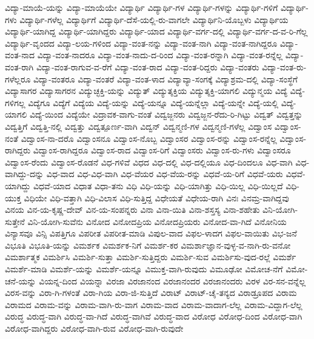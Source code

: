 {ವಿದ್ಯಾ-ಮಾಯೆ-ಯನ್ನು
ವಿದ್ಯಾ-ಮಾಯೆಯೇ
ವಿದ್ಯಾರ್ಥಿ
ವಿದ್ಯಾರ್ಥಿ-ಗಳ
ವಿದ್ಯಾರ್ಥಿ-ಗಳನ್ನು
ವಿದ್ಯಾರ್ಥಿ-ಗಳಿಗೆ
ವಿದ್ಯಾರ್ಥಿ-ಗಳು
ವಿದ್ಯಾರ್ಥಿ-ಗಳೆಲ್ಲ
ವಿದ್ಯಾರ್ಥಿಗೆ
ವಿದ್ಯಾರ್ಥಿ-ದೆಸೆ-ಯಲ್ಲಿ-ರು-ವಾಗಲೇ
ವಿದ್ಯಾರ್ಥಿನಿ-ಯೊಬ್ಬಳು
ವಿದ್ಯಾರ್ಥಿಯ
ವಿದ್ಯಾರ್ಥಿ-ಯಾಗಿದ್ದ
ವಿದ್ಯಾರ್ಥಿ-ಯಾಗಿದ್ದರು
ವಿದ್ಯಾರ್ಥಿ-ಯಾದ
ವಿದ್ಯಾರ್ಥಿ-ವರ್ಗ-ದಲ್ಲಿ
ವಿದ್ಯಾರ್ಥಿ-ವರ್ಗ-ದ-ವ-ರಿ-ಗೆಲ್ಲ
ವಿದ್ಯಾರ್ಥಿ-ವೃಂದದ
ವಿದ್ಯಾ-ಲಯ-ಗಳಿಂದ
ವಿದ್ಯಾ-ವಂತ-ನನ್ನು
ವಿದ್ಯಾ-ವಂತ-ನಾಗಿ
ವಿದ್ಯಾ-ವಂತ-ನಾಗಿದ್ದರೂ
ವಿದ್ಯಾ-ವಂತ-ನಾದ
ವಿದ್ಯಾ-ವಂತ-ನಾದರೂ
ವಿದ್ಯಾ-ವಂತ-ನಾದು-ದ-ರಿಂದ
ವಿದ್ಯಾ-ವಂತ-ರನ್ನಾಗಿ
ವಿದ್ಯಾ-ವಂತ-ರನ್ನೆಲ್ಲ
ವಿದ್ಯಾ-ವಂತ-ರಾಗಿ
ವಿದ್ಯಾ-ವಂತ-ರಾಗುವ-ವ-ರೆಗೆ
ವಿದ್ಯಾ-ವಂತ-ರಾದ
ವಿದ್ಯಾ-ವಂತ-ರಿದ್ದರು
ವಿದ್ಯಾ-ವಂತರು
ವಿದ್ಯಾ-ವಂತ-ರು-ಗಳೆಲ್ಲರೂ
ವಿದ್ಯಾ-ವಂತರೂ
ವಿದ್ಯಾ-ವಂತರೆ
ವಿದ್ಯಾ-ವಂತ-ಳಾದ
ವಿದ್ಯಾವ್ಯಾ-ಸಂಗಕ್ಕೆ
ವಿದ್ಯಾಶ್ರಮ-ದಲ್ಲಿ
ವಿದ್ಯಾ-ಸಂಸ್ಥೆಗೆ
ವಿದ್ಯಾಸಾಗರ
ವಿದ್ಯಾಸಾಗರನ
ವಿದ್ಯುಚ್ಛಕ್ತಿ-ಯನ್ನು
ವಿದ್ಯುತ್
ವಿದ್ಯುತ್ಶಕ್ತಿಯ
ವಿದ್ಯುತ್ಶಕ್ತಿ-ಯಾಗಲಿ
ವಿದ್ಯುನ್ಮಯ
ವಿದ್ಯೆ
ವಿದ್ಯೆ-ಗಳಿಗಲ್ಲ
ವಿದ್ಯೆಗೂ
ವಿದ್ಯೆಗೆ
ವಿದ್ಯೆಯ
ವಿದ್ಯೆ-ಯನ್ನು
ವಿದ್ಯೆ-ಯನ್ನೂ
ವಿದ್ಯೆ-ಯನ್ನೆಲ್ಲಾ
ವಿದ್ಯೆ-ಯನ್ನೇ
ವಿದ್ಯೆ-ಯಲ್ಲಿ
ವಿದ್ಯೆ-ಯಾಗಲಿ
ವಿದ್ಯೆ-ಯಿಂದ
ವಿದ್ಯೆಯೇ
ವಿದ್ರಾವಕ-ವಾಗು-ವಂತೆ
ವಿದ್ವಜ್ಜನರು
ವಿದ್ವಜ್ಜನ-ರೆದು-ರಿ-ಗಿಟ್ಟು
ವಿದ್ವತ್
ವಿದ್ವತ್ತನ್ನು
ವಿದ್ವತ್ತಿಗೆ
ವಿದ್ವತ್ತಿ-ನಲ್ಲಿ
ವಿದ್ವತ್ತು
ವಿದ್ವತ್ಪೂರ್ಣ-ವಾಗಿ
ವಿದ್ವನ್
ವಿದ್ವನ್ಮಣಿ-ಗಳ
ವಿದ್ವನ್ಮಣಿ-ಗಳೆಲ್ಲ
ವಿದ್ವಾಂಸ
ವಿದ್ವಾಂಸ-ನಂತೆ
ವಿದ್ವಾಂಸ-ನಾ-ದರೊ
ವಿದ್ವಾಂಸನೂ
ವಿದ್ವಾಂಸ-ನೊಬ್ಬ
ವಿದ್ವಾಂಸರ
ವಿದ್ವಾಂಸ-ರನ್ನು
ವಿದ್ವಾಂಸ-ರನ್ನೆಲ್ಲ
ವಿದ್ವಾಂಸ-ರಾಗಿದ್ದರು
ವಿದ್ವಾಂಸ-ರಾಗಿದ್ದರೂ
ವಿದ್ವಾಂಸ-ರಾದ
ವಿದ್ವಾಂಸ-ರಿಗೆ
ವಿದ್ವಾಂಸರು
ವಿದ್ವಾಂಸ-ರು-ಗಳು
ವಿದ್ವಾಂಸರೂ
ವಿದ್ವಾಂಸ-ರೆಂದು
ವಿದ್ವಾಂಸ-ರೊಡನೆ
ವಿಧ-ಗಳಿವೆ
ವಿಧದ
ವಿಧ-ದಲ್ಲಿ
ವಿಧ-ದಲ್ಲಿಯೂ
ವಿಧ-ದಿಂದಲೂ
ವಿಧ-ವಾಗಿ
ವಿಧ-ವಾಗಿದ್ದು-ದನ್ನು
ವಿಧ-ವಾದ
ವಿಧ-ವಿಧ-ವಾಗಿ
ವಿಧ-ವೆಯರ
ವಿಧ-ವೆಯ-ರನ್ನು
ವಿಧವೆ-ಯ-ರಿಗೆ
ವಿಧವೆ-ಯರು
ವಿಧವೆ-ಯಾಗಿದ್ದು
ವಿಧವೆ-ಯಾದ
ವಿಧಾತ
ವಿಧಾ-ತನು
ವಿಧಿ
ವಿಧಿ-ಯನ್ನು
ವಿಧಿ-ಯಾಗಿತ್ತು
ವಿಧಿ-ಯಿಲ್ಲ
ವಿಧಿ-ಯಿಲ್ಲದೆ
ವಿಧಿ-ಯುಕ್ತ
ವಿಧಿಯೇ
ವಿಧಿ-ವತ್ತಾಗಿ
ವಿಧಿ-ವಿಲಾಸ
ವಿಧಿ-ಸುತ್ತಿದ್ದ
ವಿಧೇಯತೆ
ವಿಧೇಯ-ರಾಗಿ
ವಿನಃ
ವಿನಮ್ರ-ವಾಗಿದ್ದವು
ವಿನಯ
ವಿನ-ಯ-ಕೃಷ್ಣ-ದೇವ್
ವಿನ-ಯ-ಸಂಪನ್ನರು
ವಿನಾ
ವಿನಾ-ಯಿತಿ
ವಿನಾ-ಶಸ್ತಸ್ಯ
ವಿನಾ-ಶಹೇತು
ವಿನಿ-ಯೋಗಿ-ಸುತ್ತೇನೆ
ವಿನಿ-ಯೋಗಿ-ಸುವೆನು
ವಿನೋದ
ವಿನೋದಪ್ರಿಯ
ವಿನೋದಪ್ರಿಯರು
ವಿನೋದ-ವಾ-ಗಿದೆ
ವಿನೋನಿಯ
ವಿನ್ಯಾಸವೂ
ವಿನ್ಸಿ
ವಿಪತ್ತಿಗೂ
ವಿಪರೀತ
ವಿಪರೀತ-ಮಾಡಿ
ವಿಪುಲ-ವಾದ
ವಿಫಲ-ಳಾದಗ
ವಿಫಲ-ವಾಯಿತು
ವಿಭ-ಜನೆ
ವಿಭೂತಿ
ವಿಭೂತಿ-ಯನ್ನು
ವಿಮರ್ಶಕ
ವಿಮರ್ಶಕ-ನಿಗೆ
ವಿಮರ್ಶ-ಕರ
ವಿಮರ್ಶಾಜ್ಞಾನ-ವುಳ್ಳ-ವ-ನಾಗಿ-ರು-ವನೋ
ವಿಮರ್ಶಾತ್ಮಕ
ವಿಮರ್ಶಿಸಿ
ವಿಮರ್ಶಿ-ಸುತ್ತಾ
ವಿಮರ್ಶಿ-ಸುತ್ತಿದ್ದರು
ವಿಮರ್ಶಿ-ಸುವ
ವಿಮರ್ಶಿಸು-ವುದ-ರಲ್ಲೆ
ವಿಮರ್ಶೆ
ವಿಮರ್ಶೆ-ಮಾಡಿ
ವಿಮರ್ಶೆ-ಯನ್ನು
ವಿಮರ್ಶೆ-ಯನ್ನೂ
ವಿಮುಕ್ತ-ವಾಗಿ-ರುವುದು
ವಿಮೂಢೋ
ವಿಮೋಚ-ನೆಗೆ
ವಿಮೋ-ಚನೆ-ಯನ್ನು
ವಿಯನ್ನ-ದಿಂದ
ವಿಯನ್ನಾ
ವಿರಜಾ
ವಿರಜಾನಂದ
ವಿರಜಾನಂದರ
ವಿರಜಾನಂದರು
ವಿರಳ
ವಿರ-ಸನ-ವನ್ನೆಲ್ಲ
ವಿರಸ-ವನ್ನು
ವಿರಾ-ಗಿ-ಗಳಂತೆ
ವಿರಾ-ಗಿಯ
ವಿರಾ-ಜಿ-ಸುತ್ತಿದೆ
ವಿರಾಟ್
ವಿರಾಟ್-ಚೈ-ತನ್ಯದ
ವಿರಾಡ್ರೂಪದ
ವಿರಾಮ
ವಿರಾಮದ
ವಿರಾಮ-ವನ್ನು
ವಿರಾಮ-ವಾಗಿ-ರು-ವಾಗ
ವಿರಾಮ-ವಾದ
ವಿರಾಮ-ವಾದಾಗ-ಲೆಲ್ಲ
ವಿರಾಮ-ವಿದ್ದಾಗ-ಲೆಲ್ಲ
ವಿರುದ್ಧ
ವಿರುದ್ಧ-ವಾಗಿ
ವಿರುದ್ಧ-ವಾ-ಗಿದೆ
ವಿರುದ್ಧ-ವಾಗಿವೆ
ವಿರುದ್ಧ-ವಾದ
ವಿರೋಧ
ವಿರೋಧ-ದಿಂದ
ವಿರೋಧ-ವಾಗಿ
ವಿರೋಧ-ವಾಗಿದ್ದರು
ವಿರೋಧ-ವಾಗಿ-ರುವ
ವಿರೋಧ-ವಾಗಿ-ರುವುದೇ
}
